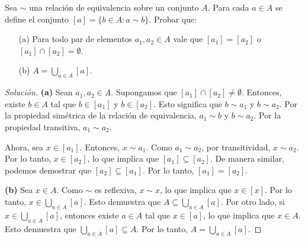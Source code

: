 \begin{exercise}[11]
    Sea $\sim$ una relación de equivalencia sobre un conjunto $A$. Para cada $a \in A$ se define el conjunto $[a] = \{b \in A : a \sim b\}$. Probar que:
    \begin{enumerate}
        \item[(a)] Para todo par de elementos $a_1, a_2 \in A$ vale que $[a_1] = [a_2]$ o $[a_1] \cap [a_2] = \emptyset$.
        \item[(b)] $A = \bigcup_{a \in A} [a]$.
    \end{enumerate}
\end{exercise}

\begin{proof}[Solución]
    \noindent\textbf{(a)} Sean $a_1, a_2 \in A$. Supongamos que $[a_1] \cap [a_2] \neq \emptyset$. Entonces, existe $b \in A$ tal que $b \in [a_1]$ y $b \in [a_2]$. Esto significa que $b \sim a_1$ y $b \sim a_2$. Por la propiedad simétrica de la relación de equivalencia, $a_1 \sim b$ y $b \sim a_2$. Por la propiedad transitiva, $a_1 \sim a_2$.

    Ahora, sea $x \in [a_1]$. Entonces, $x \sim a_1$. Como $a_1 \sim a_2$, por transitividad, $x \sim a_2$. Por lo tanto, $x \in [a_2]$, lo que implica que $[a_1] \subseteq [a_2]$. De manera similar, podemos demostrar que $[a_2] \subseteq [a_1]$. Por lo tanto, $[a_1] = [a_2]$.

    \bigskip

    \noindent\textbf{(b)} Sea $x \in A$. Como $\sim$ es reflexiva, $x \sim x$, lo que implica que $x \in [x]$. Por lo tanto, $x \in \bigcup_{a \in A} [a]$. Esto demuestra que $A \subseteq \bigcup_{a \in A} [a]$. Por otro lado, si $x \in \bigcup_{a \in A} [a]$, entonces existe $a \in A$ tal que $x \in [a]$, lo que implica que $x \in A$. Esto demuestra que $\bigcup_{a \in A} [a] \subseteq A$. Por lo tanto, $A = \bigcup_{a \in A} [a]$.
\end{proof}

